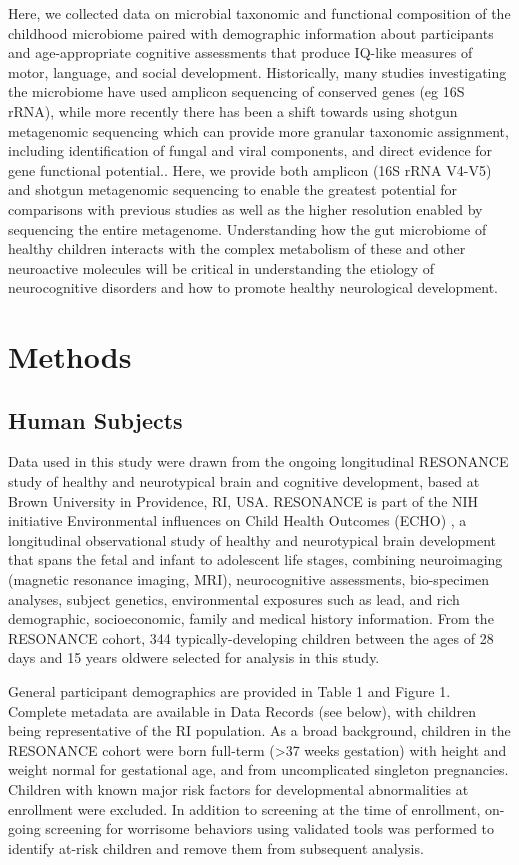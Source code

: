 \documentclass[fleqn,10pt]{wlscirep}
\begin{document}
Here, we collected data on microbial taxonomic and functional composition
of the childhood microbiome paired with demographic information about participants
and age-appropriate cognitive assessments that produce IQ-like measures of motor, language, and social development.
Historically, many studies investigating the microbiome have used amplicon sequencing of conserved genes (eg 16S rRNA),
while more recently there has been a shift towards using shotgun metagenomic sequencing
which can provide more granular taxonomic assignment, including identification of fungal and viral components,
and direct evidence for gene functional potential..
Here, we provide both amplicon (16S rRNA V4-V5) and shotgun metagenomic sequencing
to enable the greatest potential for comparisons with previous studies
as well as the higher resolution enabled by sequencing the entire metagenome.
Understanding how the gut microbiome of healthy children
interacts with the complex metabolism of these and other neuroactive molecules
will be critical in understanding the etiology of neurocognitive disorders
and how to promote healthy neurological development.



\section*{Methods}

\subsection*{Human Subjects}

Data used in this study were drawn from the ongoing longitudinal RESONANCE study
of healthy and neurotypical brain and cognitive development,
based at Brown University in Providence, RI, USA.
RESONANCE is part of the NIH initiative Environmental influences on Child Health Outcomes (ECHO) \cite{Forrest2018-ud,Gillman2018-om},
a longitudinal observational study of healthy and neurotypical brain development
that spans the fetal and infant to adolescent life stages,
combining neuroimaging (magnetic resonance imaging, MRI), neurocognitive assessments, bio-specimen analyses, subject genetics,
environmental exposures such as lead, and rich demographic, socioeconomic, family and medical history information.
From the RESONANCE cohort, 344 typically-developing children
between the ages of 28 days and 15 years oldwere selected for analysis in this study. 

General participant demographics are provided in Table 1 and Figure 1.
Complete metadata are available in Data Records (see below), with children being representative of the RI population.
As a broad background, children in the RESONANCE cohort were born full-term (>37 weeks gestation)
with height and weight normal for gestational age, and from uncomplicated singleton pregnancies.
Children with known major risk factors for developmental abnormalities at enrollment were excluded.
In addition to screening at the time of enrollment,
on-going screening for worrisome behaviors using validated tools was performed
to identify at-risk children and remove them from subsequent analysis.
\end{document}

